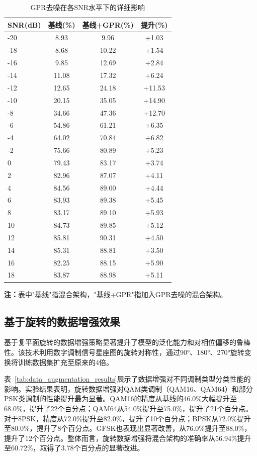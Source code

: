 \documentclass[conference]{IEEEtran}
\begin{document}
\begin{table}[h]
\centering
\caption{GPR去噪在各SNR水平下的详细影响}
\label{tab:gpr_detailed_snr}
\begin{tabular}{@{}lccc@{}}
\toprule
SNR(dB) & 基线(\%) & 基线+GPR(\%) & 提升(\%) \\
\midrule
-20 & 8.93 & 9.96 & +1.03 \\
-18 & 8.68 & 10.22 & +1.54 \\
-16 & 9.85 & 12.69 & +2.84 \\
-14 & 11.08 & 17.32 & +6.24 \\
-12 & 12.65 & 24.18 & +11.53 \\
-10 & 20.15 & 35.05 & +14.90 \\
-8 & 34.66 & 47.36 & +12.70 \\
-6 & 54.86 & 61.21 & +6.35 \\
-4 & 64.02 & 70.84 & +6.82 \\
-2 & 75.66 & 80.89 & +5.23 \\
0 & 79.43 & 83.17 & +3.74 \\
2 & 82.96 & 87.07 & +4.11 \\
4 & 84.56 & 89.00 & +4.44 \\
6 & 83.93 & 89.38 & +5.45 \\
8 & 83.17 & 89.10 & +5.93 \\
10 & 84.73 & 89.85 & +5.12 \\
12 & 85.81 & 90.31 & +4.50 \\
14 & 85.31 & 88.81 & +3.50 \\
16 & 82.25 & 88.15 & +5.90 \\
18 & 83.87 & 88.98 & +5.11 \\
\bottomrule
\end{tabular}
\end{table}

\textbf{注：}表中"基线"指混合架构，"基线+GPR"指加入GPR去噪的混合架构。

\subsection{基于旋转的数据增强效果}

基于复平面旋转的数据增强策略显著提升了模型的泛化能力和对相位偏移的鲁棒性。该技术利用数字调制信号星座图的旋转对称性，通过90°、180°、270°旋转变换将训练数据集扩充至原来的4倍。

表~\ref{tab:data_augmentation_results}展示了数据增强对不同调制类型分类性能的影响。实验结果表明，旋转数据增强对QAM类调制（QAM16、QAM64）和部分PSK类调制的性能提升最为显著。QAM16的精度从基线的46.0\%大幅提升至68.0\%，提升了22个百分点；QAM64从54.0\%提升至75.0\%，提升了21个百分点。对于8PSK，精度从72.0\%提升至82.0\%，提升了10个百分点；BPSK从72.0\%提升至80.0\%，提升了8个百分点。GFSK也表现出显著改善，从76.0\%提升至88.0\%，提升了12个百分点。整体而言，旋转数据增强将混合架构的准确率从56.94\%提升至60.72\%，取得了3.78个百分点的显著改进。
\end{document}
